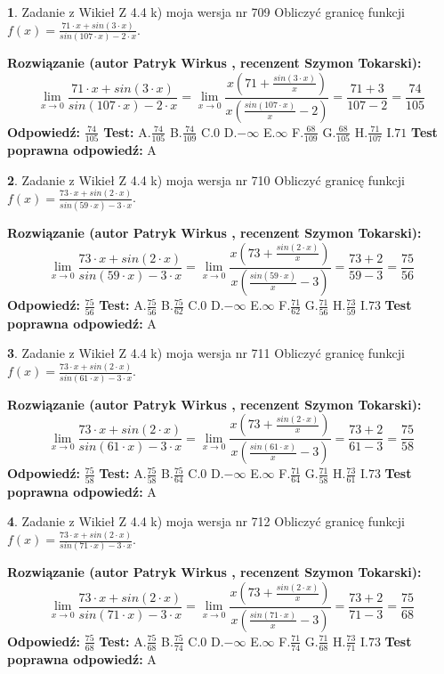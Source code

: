 \documentclass[12pt, a4paper]{article}
\theoremstyle{definition} %
\newtheorem{zad}{}
\newcommand{\zadStart}[1]{\begin{zad}#1\newline}
\newcommand{\zadStop}{\end{zad}}
\newcommand{\rozwStart}[2]{\noindent \textbf{Rozwiązanie (autor #1 , recenzent #2): }\newline}
\newcommand{\rozwStop}{\newline}
\newcommand{\odpStart}{\noindent \textbf{Odpowiedź:}\newline}
\newcommand{\odpStop}{\newline}
\newcommand{\testStart}{\noindent \textbf{Test:}\newline}
\newcommand{\testStop}{\newline}
\newcommand{\kluczStart}{\noindent \textbf{Test poprawna odpowiedź:}\newline}
\newcommand{\kluczStop}{\newline}
\begin{document}
\zadStart{Zadanie z Wikieł Z 4.4 k) moja wersja nr 709}
Obliczyć granicę funkcji $f(x)=\frac{71\cdot x +sin(3\cdot x)}{sin(107\cdot x) -2\cdot x}$.
\zadStop
\rozwStart{Patryk Wirkus}{Szymon Tokarski}
$$\lim\limits_{x\to 0}\frac{71\cdot x +sin(3\cdot x)}{sin(107\cdot x) -2\cdot x}
=\lim\limits_{x\to 0}\frac{x(71+\frac{sin(3\cdot x)}{x})}{x(\frac{sin(107\cdot x)}{x}-2)}
=\frac{71+3}{107-2} = \frac{74}{105}$$
\rozwStop
\odpStart
$\frac{74}{105}$
\odpStop
\testStart
A.$\frac{74}{105}$
B.$\frac{74}{109}$
C.$0$
D.$-\infty$
E.$\infty$
F.$\frac{68}{109}$
G.$\frac{68}{105}$
H.$\frac{71}{107}$
I.$71$
\testStop
\kluczStart
A
\kluczStop



\zadStart{Zadanie z Wikieł Z 4.4 k) moja wersja nr 710}
Obliczyć granicę funkcji $f(x)=\frac{73\cdot x +sin(2\cdot x)}{sin(59\cdot x) -3\cdot x}$.
\zadStop
\rozwStart{Patryk Wirkus}{Szymon Tokarski}
$$\lim\limits_{x\to 0}\frac{73\cdot x +sin(2\cdot x)}{sin(59\cdot x) -3\cdot x}
=\lim\limits_{x\to 0}\frac{x(73+\frac{sin(2\cdot x)}{x})}{x(\frac{sin(59\cdot x)}{x}-3)}
=\frac{73+2}{59-3} = \frac{75}{56}$$
\rozwStop
\odpStart
$\frac{75}{56}$
\odpStop
\testStart
A.$\frac{75}{56}$
B.$\frac{75}{62}$
C.$0$
D.$-\infty$
E.$\infty$
F.$\frac{71}{62}$
G.$\frac{71}{56}$
H.$\frac{73}{59}$
I.$73$
\testStop
\kluczStart
A
\kluczStop



\zadStart{Zadanie z Wikieł Z 4.4 k) moja wersja nr 711}
Obliczyć granicę funkcji $f(x)=\frac{73\cdot x +sin(2\cdot x)}{sin(61\cdot x) -3\cdot x}$.
\zadStop
\rozwStart{Patryk Wirkus}{Szymon Tokarski}
$$\lim\limits_{x\to 0}\frac{73\cdot x +sin(2\cdot x)}{sin(61\cdot x) -3\cdot x}
=\lim\limits_{x\to 0}\frac{x(73+\frac{sin(2\cdot x)}{x})}{x(\frac{sin(61\cdot x)}{x}-3)}
=\frac{73+2}{61-3} = \frac{75}{58}$$
\rozwStop
\odpStart
$\frac{75}{58}$
\odpStop
\testStart
A.$\frac{75}{58}$
B.$\frac{75}{64}$
C.$0$
D.$-\infty$
E.$\infty$
F.$\frac{71}{64}$
G.$\frac{71}{58}$
H.$\frac{73}{61}$
I.$73$
\testStop
\kluczStart
A
\kluczStop



\zadStart{Zadanie z Wikieł Z 4.4 k) moja wersja nr 712}
Obliczyć granicę funkcji $f(x)=\frac{73\cdot x +sin(2\cdot x)}{sin(71\cdot x) -3\cdot x}$.
\zadStop
\rozwStart{Patryk Wirkus}{Szymon Tokarski}
$$\lim\limits_{x\to 0}\frac{73\cdot x +sin(2\cdot x)}{sin(71\cdot x) -3\cdot x}
=\lim\limits_{x\to 0}\frac{x(73+\frac{sin(2\cdot x)}{x})}{x(\frac{sin(71\cdot x)}{x}-3)}
=\frac{73+2}{71-3} = \frac{75}{68}$$
\rozwStop
\odpStart
$\frac{75}{68}$
\odpStop
\testStart
A.$\frac{75}{68}$
B.$\frac{75}{74}$
C.$0$
D.$-\infty$
E.$\infty$
F.$\frac{71}{74}$
G.$\frac{71}{68}$
H.$\frac{73}{71}$
I.$73$
\testStop
\kluczStart
A
\kluczStop
\end{document}
